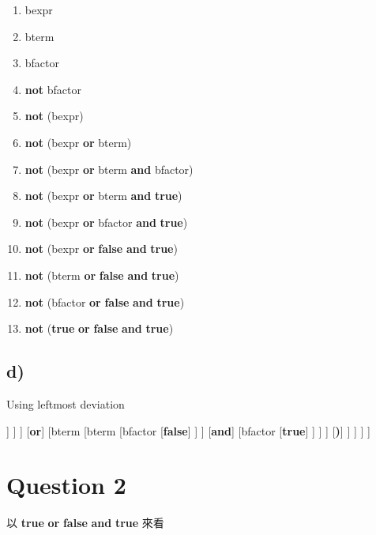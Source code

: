 \documentclass[12pt, A4]{article}
\begin{document}
	\begin{enumerate}
		\item bexpr
		\item bterm
		\item bfactor
		\item \textbf{not} bfactor
		\item \textbf{not} (bexpr)
		\item \textbf{not} (bexpr \textbf{or} bterm)
		\item \textbf{not} (bexpr \textbf{or} bterm \textbf{and} bfactor)
		\item \textbf{not} (bexpr \textbf{or} bterm \textbf{and} \textbf{true})
		\item \textbf{not} (bexpr \textbf{or} bfactor \textbf{and} \textbf{true})
		\item \textbf{not} (bexpr \textbf{or} \textbf{false} \textbf{and} \textbf{true})
		\item \textbf{not} (bterm \textbf{or} \textbf{false} \textbf{and} \textbf{true})
		\item \textbf{not} (bfactor \textbf{or} \textbf{false} \textbf{and} \textbf{true})
		\item \textbf{not} (\textbf{true} \textbf{or} \textbf{false} \textbf{and} \textbf{true})
	\end{enumerate}
	
	\newpage
	\subsection*{d)}
	
	Using leftmost deviation \\
	
	\begin{forest}
		[bexpr
			[bterm
				[bfactor
					[\textbf{not}]
					[bfactor
						[\textbf{(}]
						[bexpr
							[bexpr
								[bterm
									[bfactor
										[\textbf{true}]
									]
								]
							]
							[\textbf{or}]
							[bterm
								[bterm
									[bfactor
										[\textbf{false}]
									]
								]
								[\textbf{and}]
								[bfactor
									[\textbf{true}]
								]
							]
						]
						[\textbf{)}]
					]
				]
			]
		]
	\end{forest}
	
	\newpage
	\section{Question 2}
	
	以 \textbf{true} \textbf{or} \textbf{false} \textbf{and} \textbf{true}  來看
	
\end{document}

